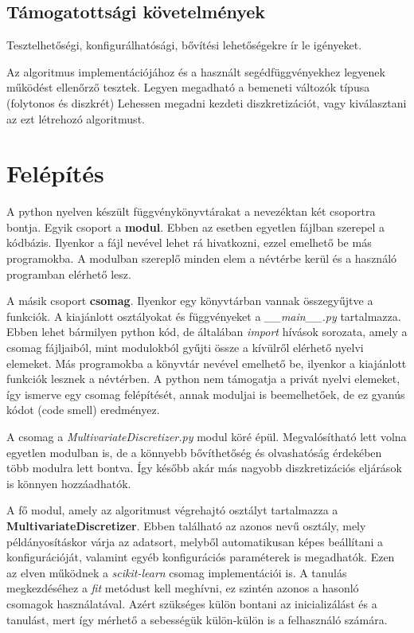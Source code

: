\subsection{Támogatottsági követelmények}
    Tesztelhetőségi, konfigurálhatósági, bővítési lehetőségekre ír le igényeket.

\begin{enumerate}[resume]
     Az algoritmus implementációjához és a használt segédfüggvényekhez legyenek működést ellenőrző tesztek.
     Legyen megadható a bemeneti változók típusa (folytonos és diszkrét)
     Lehessen megadni kezdeti diszkretizációt, vagy kiválasztani az ezt létrehozó algoritmust.
\end{enumerate}

\section{Felépítés}
A python nyelven készült függvénykönyvtárakat a nevezéktan két csoportra bontja. Egyik csoport a \textbf{modul}. Ebben az esetben egyetlen fájlban szerepel a kódbázis. Ilyenkor a fájl nevével lehet rá hivatkozni, ezzel emelhető be más programokba. A modulban szereplő minden elem a névtérbe kerül és a használó programban elérhető lesz.

A másik csoport \textbf{csomag}. Ilyenkor egy könyvtárban vannak összegyűjtve a funkciók. A kiajánlott osztályokat és függvényeket a \textit{\_\_main\_\_.py} tartalmazza. Ebben lehet bármilyen python kód, de általában \textit{import} hívások sorozata, amely a csomag fájljaiból, mint modulokból gyűjti össze a kívülről elérhető nyelvi elemeket. Más programokba a könyvtár nevével emelhető be, ilyenkor a kiajánlott funkciók lesznek a névtérben. A python nem támogatja a privát nyelvi elemeket, így ismerve egy csomag felépítését, annak moduljai is beemelhetőek, de ez gyanús kódot (code smell) eredményez.

A csomag a \textit{MultivariateDiscretizer.py} modul köré épül. Megvalósítható lett volna egyetlen modulban is, de a könnyebb bővíthetőség és olvashatóság érdekében több modulra lett bontva. Így később akár más nagyobb diszkretizációs eljárások is könnyen hozzáadhatók.

A fő modul, amely az algoritmust végrehajtó osztályt tartalmazza a \textbf{MultivariateDiscretizer}. Ebben található az azonos nevű osztály, mely példányosításkor várja az adatsort, melyből automatikusan képes beállítani a konfigurációját, valamint egyéb konfigurációs paraméterek is megadhatók. Ezen az elven működnek a \textit{scikit-learn} csomag implementációi is. A tanulás megkezdéséhez a \textit{fit} metódust kell meghívni, ez szintén azonos a hasonló csomagok használatával. Azért szükséges külön bontani az inicializálást és a tanulást, mert így mérhető a sebességük külön-külön is a felhasználó számára.

